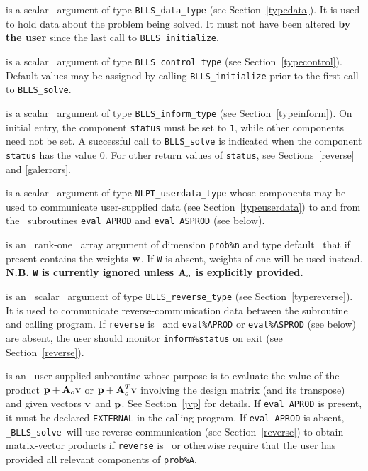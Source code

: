 \documentclass{galahad}
\newcommand{\packagename}{BLLS}
\newcommand{\fullpackagename}{\libraryname\_\packagename}
\newcommand{\solver}{{\tt \fullpackagename\_solve}}
\begin{document}
\begin{description}
 is a scalar \intentinout\ argument of type
{\tt \packagename\_data\_type}
(see Section~\ref{typedata}). It is used to hold data about the problem being
solved. It must not have been altered {\bf by the user} since the last call to
{\tt \packagename\_initialize}.

 is a scalar \intentin\ argument of type
{\tt \packagename\_control\_type}
(see Section~\ref{typecontrol}). Default values may be assigned by calling
{\tt \packagename\_initialize} prior to the first call to
{\tt \packagename\_solve}.

 is a scalar \intentinout\ argument of type
{\tt \packagename\_inform\_type}
(see Section~\ref{typeinform}). On initial entry, the component {\tt status}
must be set to {\tt 1}, while other components need not be set.
A successful call to
{\tt \packagename\_solve}
is indicated when the  component {\tt status} has the value 0.
For other return values of {\tt status}, see Sections~\ref{reverse} and
\ref{galerrors}.

 is a scalar \intentinout\ argument of type
{\tt NLPT\_userdata\_type} whose components may be used
to communicate user-supplied data
(see Section~\ref{typeuserdata})
to and from the \optional\ subroutines
 {\tt eval\_APROD} and {\tt eval\_ASPROD} (see below).

 is an \optional\ rank-one \intentinout\ array argument of dimension 
{\tt prob\%n} and type default \realdp\ that if present contains the weights
${\mathbf{w}}$. If {\tt W} is absent, weights of one will be used instead.
{\bf N.B. {\tt W} is currently ignored unless ${\mathbf{A}}_o$ is explicitly
provided.}

 is an \optional\ scalar \intentinout\ argument of type
{\tt \packagename\_reverse\_type}
(see Section~\ref{typereverse}).
It is used to communicate reverse-communication data between the
subroutine and calling program.
If {\tt reverse} is \present\ and {\tt eval\%APROD} or {\tt eval\%ASPROD}
(see below) are absent, the user should monitor {\tt inform\%status} on exit
(see Section~\ref{reverse}).

 is an \optional\
user-supplied subroutine whose purpose is to evaluate the value of the
product ${\mathbf{p}} + {\mathbf{A}}_o {\mathbf{v}}$ or ${\mathbf{p}} + {\mathbf{A}}_o^T {\mathbf{v}}$
involving the design matrix (and its transpose) 
and given vectors ${\mathbf{v}}$ and ${\mathbf{p}}$.
See Section~\ref{jvp} for details.
If {\tt eval\_APROD} is present,
it must be declared {\tt EXTERNAL} in the calling program.
If {\tt eval\_APROD} is absent, \solver\ will use reverse communication
(see Section~\ref{reverse})
to obtain matrix-vector products if {\tt reverse} is \present\ or
otherwise require that the user has provided all relevant
components of {\tt prob\%A}.


\end{description}
\end{document}
